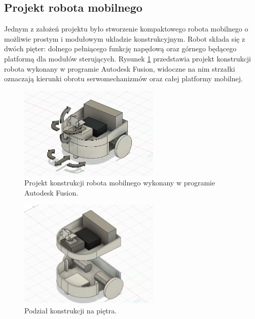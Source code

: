 \documentclass[a4paper,twoside,12pt]{book}
\begin{document}
\subsection{Projekt robota mobilnego}
Jednym z założeń projektu było stworzenie kompaktowego robota mobilnego o możliwie prostym i modułowym układzie konstrukcyjnym. Robot składa się z dwóch pięter: dolnego pełniącego funkcję napędową oraz górnego będącego platformą dla modułów sterujących. Rysunek \ref{fig:Robot projekt} przedstawia projekt konstrukcji robota wykonany w programie Autodesk Fusion, widoczne na nim strzałki oznaczają kierunki obrotu serwomechanizmów oraz całej platformy mobilnej.
\begin{figure}[h]
    \centering
    \includegraphics[width=0.6\textwidth]{Images/Robot/Robot kierunki.png}
    \caption{Projekt konstrukcji robota mobilnego wykonany w programie Autodesk Fusion.}
    \label{fig:Robot projekt}
\end{figure}
\begin{figure}[h]
    \centering
    \includegraphics[width=0.6\textwidth]{Images/Robot/Robot piętra.png}
    \caption{Podział konstrukcji na piętra.}
    \label{fig:Robot piętra}
\end{figure}
\end{document}
